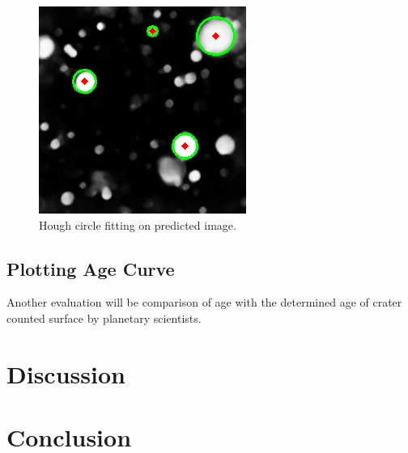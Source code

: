 \documentclass[11pt]{article}
\begin{document}
\begin{figure}[H]
	\centering
	\includegraphics[width=.4\textwidth]{files/results/hough.png}
	\caption{Hough circle fitting on predicted image.}
	\label{hough}
\end{figure}

\subsection{Plotting Age Curve}
Another evaluation will be comparison of age with the determined age of crater counted surface by planetary scientists.

\section{Discussion}

\section{Conclusion}



\newpage
\clearpage




	


\end{document}

